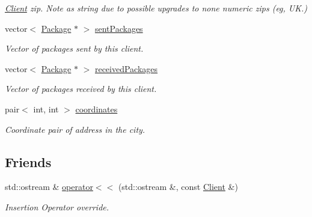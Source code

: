 \begin{DoxyCompactItemize}
\begin{DoxyCompactList}\small\item\em \hyperlink{classClient}{Client} zip. Note as string due to possible upgrades to none numeric zips (eg, UK.) \end{DoxyCompactList}\item 
vector$<$ \hyperlink{classPackage}{Package} $\ast$ $>$ \hyperlink{classClient_a2b2adb035b1729e5914a2ff85e672c88}{sent\+Packages}\hypertarget{classClient_a2b2adb035b1729e5914a2ff85e672c88}{}\label{classClient_a2b2adb035b1729e5914a2ff85e672c88}

\begin{DoxyCompactList}\small\item\em Vector of packages sent by this client. \end{DoxyCompactList}\item 
vector$<$ \hyperlink{classPackage}{Package} $\ast$ $>$ \hyperlink{classClient_ae0b61b806652c0dd46a5ef3e0308fb51}{received\+Packages}\hypertarget{classClient_ae0b61b806652c0dd46a5ef3e0308fb51}{}\label{classClient_ae0b61b806652c0dd46a5ef3e0308fb51}

\begin{DoxyCompactList}\small\item\em Vector of packages received by this client. \end{DoxyCompactList}\item 
pair$<$ int, int $>$ \hyperlink{classClient_a521946a39509ca76f9ef7bea68e47153}{coordinates}\hypertarget{classClient_a521946a39509ca76f9ef7bea68e47153}{}\label{classClient_a521946a39509ca76f9ef7bea68e47153}

\begin{DoxyCompactList}\small\item\em Coordinate pair of address in the city. \end{DoxyCompactList}\end{DoxyCompactItemize}
\subsection*{Friends}
\begin{DoxyCompactItemize}
\item 
std\+::ostream \& \hyperlink{classClient_adeb74b47c51aa4da00d60e8ba153a4ed}{operator$<$$<$} (std\+::ostream \&, const \hyperlink{classClient}{Client} \&)\hypertarget{classClient_adeb74b47c51aa4da00d60e8ba153a4ed}{}\label{classClient_adeb74b47c51aa4da00d60e8ba153a4ed}

\begin{DoxyCompactList}\small\item\em Insertion Operator override. \end{DoxyCompactList}\end{DoxyCompactItemize}


